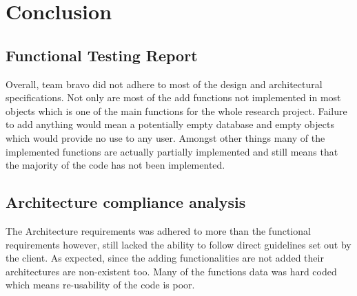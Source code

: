 \documentclass{article}
\begin{document}
	\section{Conclusion}
	\subsection{Functional Testing Report}
	Overall, team bravo did not adhere to most of the design and architectural specifications. Not only are most of the add functions not implemented in most objects which is one of the main functions for the whole research project. Failure to add anything would mean a potentially empty database and empty objects which would provide no use to any user. Amongst other things many of the implemented functions are actually partially implemented and still means that the majority of the code has not been implemented.
	\subsection{Architecture compliance analysis}
	The Architecture requirements was adhered to more than the functional requirements however, still lacked the ability to follow direct guidelines set out by the client. As expected, since the adding functionalities are not added their architectures are non-existent too. Many of the functions data was hard coded which means re-usability of the code is poor. 
	
	
\end{document}
